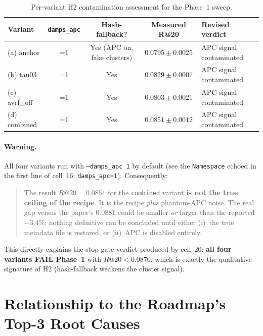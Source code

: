 \documentclass[11pt,a4paper]{article}
\begin{document}
\begin{table}[h]
\centering
\renewcommand{\arraystretch}{1.25}
\begin{tabularx}{\textwidth}{|l|c|c|c|X|}
\hline
\textbf{Variant} & \texttt{damps\_apc} & \textbf{Hash-fallback?} &
\textbf{Measured R@20} & \textbf{Revised verdict} \\
\hline
(a) anchor    & =1 & Yes (APC on, fake clusters) & $0.0795 \pm 0.0025$ &
APC signal contaminated \\
\hline
(b) tau03     & =1 & Yes & $0.0829 \pm 0.0007$ &
APC signal contaminated \\
\hline
(c) avrf\_off & =1 & Yes & $0.0803 \pm 0.0021$ &
APC signal contaminated \\
\hline
(d) combined  & =1 & Yes & $\mathbf{0.0851 \pm 0.0012}$ &
APC signal contaminated \\
\hline
\end{tabularx}
\caption{Per-variant H2 contamination assessment for the Phase~1 sweep.}
\label{tab:variant-impact}
\end{table}

\paragraph{Warning.} All four variants run with \texttt{--damps\_apc 1} by
default (see the \texttt{Namespace} echoed in the first line of cell~16:
\texttt{damps\_apc=1}). Consequently:

\begin{quote}
The result $R@20 = 0.0851$ for the \texttt{combined} variant
\textbf{is not the true ceiling of the recipe}. It is the recipe \emph{plus}
phantom-APC noise. The real gap versus the paper's $0.0881$ could be smaller
\emph{or} larger than the reported $-3.4\%$; nothing definitive can be
concluded until either (i)~the true metadata file is restored, or
(ii)~APC is disabled entirely.
\end{quote}

\noindent This directly explains the stop-gate verdict produced by cell~20:
\textbf{all four variants FAIL Phase~1} with $R@20 < 0.0870$, which is
exactly the qualitative signature of H2 (hash-fallback weakens the cluster
signal).

\section{Relationship to the Roadmap's Top-3 Root Causes}
\end{document}
